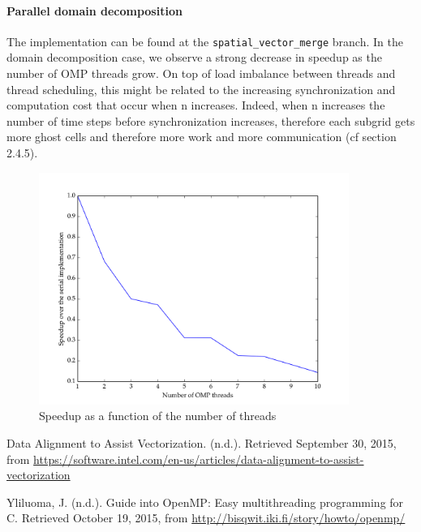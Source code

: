 \documentclass[11pt]{article}
\begin{document}
\paragraph{Parallel domain decomposition}

The implementation can be found at the \texttt{spatial\_vector\_merge} branch. In the domain decomposition case, we observe a strong decrease in speedup as the number of OMP threads grow. On top of load imbalance between threads and thread scheduling, this might be related to the increasing synchronization and computation cost that occur when n increases. Indeed, when n increases the number of time steps before synchronization increases, therefore each subgrid gets more ghost cells and therefore more work and more communication (cf section 2.4.5).
 \begin{figure}[H]
    \includegraphics[width=0.9\textwidth]{./weak_scaling/weak_scaling.png}
    \caption{Speedup as a function of the number of threads}
    \label{fig:weak_scaling_dd}
\end{figure} 




\begin{thebibliography}{9}
Data Alignment to Assist Vectorization. (n.d.). Retrieved September 30, 2015, from \url{https://software.intel.com/en-us/articles/data-alignment-to-assist-vectorization}

Yliluoma, J. (n.d.). Guide into OpenMP: Easy multithreading programming for C. Retrieved October 19, 2015, from \url{http://bisqwit.iki.fi/story/howto/openmp/}

\end{thebibliography}

 
 
\end{document}
